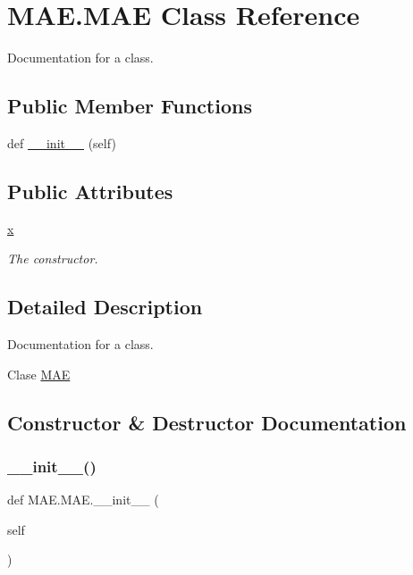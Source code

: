 \hypertarget{class_m_a_e_1_1_m_a_e}{}\section{M\+A\+E.\+M\+AE Class Reference}
\label{class_m_a_e_1_1_m_a_e}


Documentation for a class.  


\subsection*{Public Member Functions}
\begin{DoxyCompactItemize}
\item 
def \mbox{\hyperlink{class_m_a_e_1_1_m_a_e_acf334c43862b1112d21fa019c3827bd0}{\+\_\+\+\_\+init\+\_\+\+\_\+}} (self)
\end{DoxyCompactItemize}
\subsection*{Public Attributes}
\begin{DoxyCompactItemize}
\item 
\mbox{\hyperlink{class_m_a_e_1_1_m_a_e_ae516329fc350a56b5a50fe0b922aa6fa}{x}}
\begin{DoxyCompactList}\small\item\em The constructor. \end{DoxyCompactList}\end{DoxyCompactItemize}


\subsection{Detailed Description}
Documentation for a class. 

Clase \mbox{\hyperlink{class_m_a_e_1_1_m_a_e}{M\+AE}} 

\subsection{Constructor \& Destructor Documentation}
\mbox{\label{class_m_a_e_1_1_m_a_e_acf334c43862b1112d21fa019c3827bd0}} 
\subsubsection{\texorpdfstring{\+\_\+\+\_\+init\+\_\+\+\_\+()}{\_\_init\_\_()}}
{\footnotesize\ttfamily def M\+A\+E.\+M\+A\+E.\+\_\+\+\_\+init\+\_\+\+\_\+ (\begin{DoxyParamCaption}\item[{}]{self }\end{DoxyParamCaption})}



